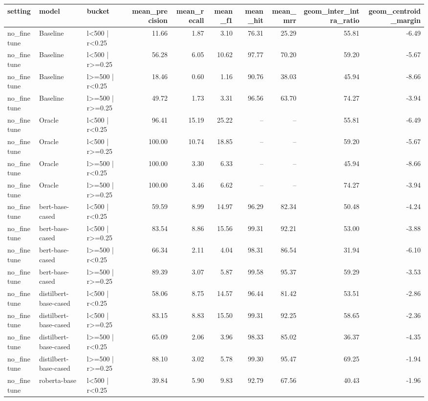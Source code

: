 \begin{tabular}{lllrrrrrrr}
\toprule
setting & model & bucket & mean_precision & mean_recall & mean_f1 & mean_hit & mean_mrr & geom_inter_intra_ratio & geom_centroid_margin \\
\midrule
no_finetune & Baseline & l<500 | r<0.25 & 11.66 & 1.87 & 3.10 & 76.31 & 25.29 & 55.81 & -6.49 \\
no_finetune & Baseline & l<500 | r>=0.25 & 56.28 & 6.05 & 10.62 & 97.77 & 70.20 & 59.20 & -5.67 \\
no_finetune & Baseline & l>=500 | r<0.25 & 18.46 & 0.60 & 1.16 & 90.76 & 38.03 & 45.94 & -8.66 \\
no_finetune & Baseline & l>=500 | r>=0.25 & 49.72 & 1.73 & 3.31 & 96.56 & 63.70 & 74.27 & -3.94 \\
no_finetune & Oracle & l<500 | r<0.25 & 96.41 & 15.19 & 25.22 & -- & -- & 55.81 & -6.49 \\
no_finetune & Oracle & l<500 | r>=0.25 & 100.00 & 10.74 & 18.85 & -- & -- & 59.20 & -5.67 \\
no_finetune & Oracle & l>=500 | r<0.25 & 100.00 & 3.30 & 6.33 & -- & -- & 45.94 & -8.66 \\
no_finetune & Oracle & l>=500 | r>=0.25 & 100.00 & 3.46 & 6.62 & -- & -- & 74.27 & -3.94 \\
no_finetune & bert-base-cased & l<500 | r<0.25 & 59.59 & 8.99 & 14.97 & 96.29 & 82.34 & 50.48 & -4.24 \\
no_finetune & bert-base-cased & l<500 | r>=0.25 & 83.54 & 8.86 & 15.56 & 99.31 & 92.21 & 53.00 & -3.88 \\
no_finetune & bert-base-cased & l>=500 | r<0.25 & 66.34 & 2.11 & 4.04 & 98.31 & 86.54 & 31.94 & -6.10 \\
no_finetune & bert-base-cased & l>=500 | r>=0.25 & 89.39 & 3.07 & 5.87 & 99.58 & 95.37 & 59.29 & -3.53 \\
no_finetune & distilbert-base-cased & l<500 | r<0.25 & 58.06 & 8.75 & 14.57 & 96.44 & 81.42 & 53.51 & -2.86 \\
no_finetune & distilbert-base-cased & l<500 | r>=0.25 & 83.15 & 8.83 & 15.50 & 99.31 & 92.25 & 58.65 & -2.36 \\
no_finetune & distilbert-base-cased & l>=500 | r<0.25 & 65.09 & 2.06 & 3.96 & 98.33 & 85.02 & 36.37 & -4.35 \\
no_finetune & distilbert-base-cased & l>=500 | r>=0.25 & 88.10 & 3.02 & 5.78 & 99.30 & 95.47 & 69.25 & -1.94 \\
no_finetune & roberta-base & l<500 | r<0.25 & 39.84 & 5.90 & 9.83 & 92.79 & 67.56 & 40.43 & -1.96 \\

\end{tabular}
